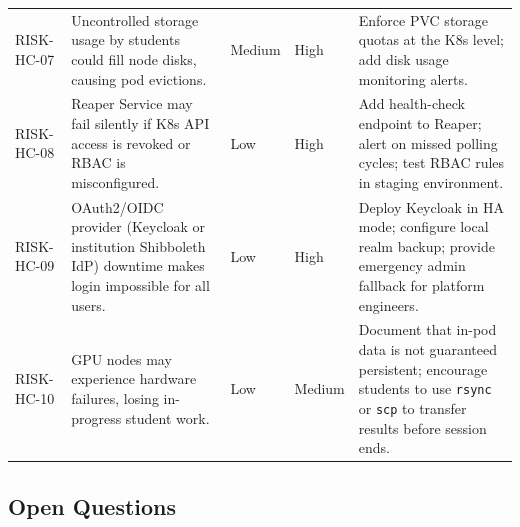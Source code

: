 \documentclass[12pt,a4paper]{article}
\begin{document}
\begin{longtable}{@{}L{2cm}L{4.5cm}L{1.5cm}L{1.5cm}L{5cm}@{}}
  RISK-HC-07 & Uncontrolled storage usage by students could fill node disks, causing pod evictions. & Medium & High & Enforce PVC storage quotas at the K8s level; add disk usage monitoring alerts. \\
    RISK-HC-08 & Reaper Service may fail silently if K8s API access is revoked or RBAC is misconfigured. & Low & High & Add health-check endpoint to Reaper; alert on missed polling cycles; test RBAC rules in staging environment. \\
  RISK-HC-09 & OAuth2/OIDC provider (Keycloak or institution Shibboleth IdP) downtime makes login impossible for all users. & Low & High & Deploy Keycloak in HA mode; configure local realm backup; provide emergency admin fallback for platform engineers. \\
    RISK-HC-10 & GPU nodes may experience hardware failures, losing in-progress student work. & Low & Medium & Document that in-pod data is not guaranteed persistent; encourage students to use \texttt{rsync} or \texttt{scp} to transfer results before session ends. \\
\end{longtable}

\subsection{Open Questions}
\end{document}
